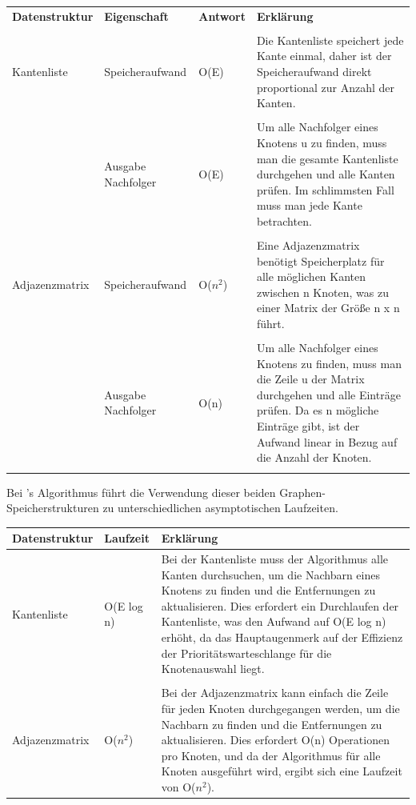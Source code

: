 \documentclass{article}
\begin{document}
\begin{table}[H] 
    \centering
    \begin{tabular}{p{2.5cm} | p{2.5cm} p{1.5cm} p{8cm}}
         \textbf{Datenstruktur} & \textbf{Eigenschaft} & \textbf{Antwort} & \textbf{Erklärung} \\ \\ \hline    
         Kantenliste \index{Kantenliste} & Speicheraufwand & O(E) &  Die Kantenliste speichert jede Kante einmal, daher ist der Speicheraufwand direkt proportional zur Anzahl der Kanten. \\ \\
          & Ausgabe Nachfolger & O(E) & Um alle Nachfolger eines Knotens u zu finden, muss man die gesamte Kantenliste durchgehen und alle Kanten prüfen. Im schlimmsten Fall muss man jede Kante betrachten. \\ \\  
         Adjazenzmatrix\index{Adjazenzmatrix}  & Speicheraufwand & O($n^2$) & Eine Adjazenzmatrix benötigt Speicherplatz für alle möglichen Kanten zwischen n Knoten, was zu einer Matrix der Größe n x n führt. \\ \\
         & Ausgabe Nachfolger & O(n) & Um alle Nachfolger eines Knotens zu finden, muss man die Zeile u der Matrix durchgehen und alle Einträge prüfen. Da es n mögliche Einträge gibt, ist der Aufwand linear in Bezug auf die Anzahl der Knoten. \\ \\
    \end{tabular}
    \label{tab:Speicheraufwand_Nachfolger}
\end{table}
\noindent
Bei 's Algorithmus führt die Verwendung dieser beiden Graphen-
Speicherstrukturen zu unterschiedlichen asymptotischen Laufzeiten. 
\begin{table}[H]
    \centering
    \begin{tabular}{p{2.5cm} | p{2.5cm} p{9cm}}
          \textbf{Datenstruktur} & \textbf{Laufzeit} & \textbf{Erklärung}  \\ \hline  
        Kantenliste \index{Kantenliste} & O(E log n)  & Bei der Kantenliste muss der Algorithmus alle Kanten durchsuchen, um die Nachbarn eines Knotens zu finden und die Entfernungen zu aktualisieren. Dies erfordert ein Durchlaufen der Kantenliste, was den Aufwand auf O(E log n) erhöht, da das Hauptaugenmerk auf der Effizienz der Prioritätswarteschlange für die Knotenauswahl liegt. \\ \\
        Adjazenzmatrix\index{Adjazenzmatrix} & O($n^2$) & Bei der Adjazenzmatrix kann einfach die Zeile für jeden Knoten durchgegangen werden, um die Nachbarn zu finden und die Entfernungen zu aktualisieren. Dies erfordert O(n) Operationen pro Knoten, und da der Algorithmus für alle Knoten ausgeführt wird, ergibt sich eine Laufzeit von O($n^2$).
    \end{tabular}
    \label{tab:Dijkstra_asymptotische_Laufzeiten}
\end{table}
  \noindent  
\end{document}

